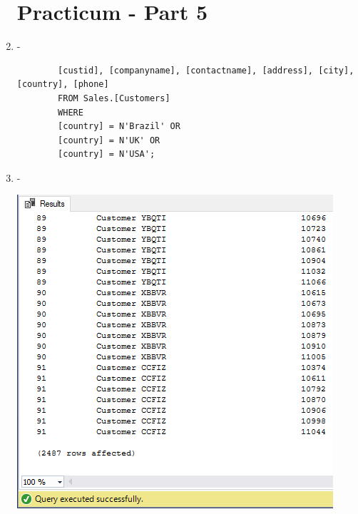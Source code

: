 \documentclass[12pt,titlepage]{article}
\begin{document}
\begin{enumerate}
    \section*{Practicum - Part 5}
    \item -
    \begin{verbatim}
        [custid], [companyname], [contactname], [address], [city], [country], [phone]
        FROM Sales.[Customers]
        WHERE
        [country] = N'Brazil' OR
        [country] = N'UK' OR
        [country] = N'USA';
    \end{verbatim}
    \item -
    \begin{center}
        \includegraphics[height=.45\textheight]{images/figures/fig8.png}
    \end{center}
\end{enumerate}
\end{document}
